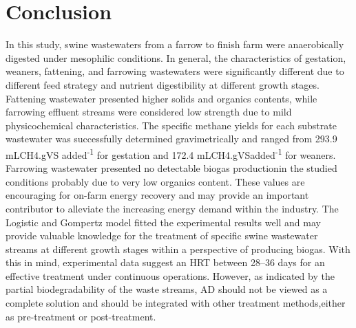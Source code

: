 \section{Conclusion}
In this study, swine wastewaters from a farrow to finish farm were anaerobically digested under mesophilic conditions. In general, the characteristics of gestation, weaners, fattening, and farrowing wastewaters were significantly different due to different feed strategy and nutrient digestibility at different growth stages. Fattening wastewater presented higher solids and organics contents, while farrowing effluent streams were considered low strength due to mild physicochemical characteristics. The specific methane yields for each substrate wastewater was successfully determined gravimetrically and ranged from 293.9 mLCH4.gVS added\textsuperscript{-1} for gestation and 172.4 mLCH4.gVSadded\textsuperscript{-1} for weaners. Farrowing wastewater presented no detectable biogas productionin the studied conditions probably due to very low organics content. These values are encouraging for on-farm energy recovery and may provide an important contributor to
alleviate the increasing energy demand within the industry. The Logistic and Gompertz model fitted the experimental results well and may provide valuable knowledge for the treatment of specific swine wastewater streams at different growth stages within a perspective of producing biogas. With this in mind, experimental data suggest an HRT between 28–36 days for an effective treatment under continuous operations. However, as indicated by the partial biodegradability of the waste streams, AD should not be viewed as a complete solution and should be integrated with other treatment methods,either as pre-treatment or post-treatment.
